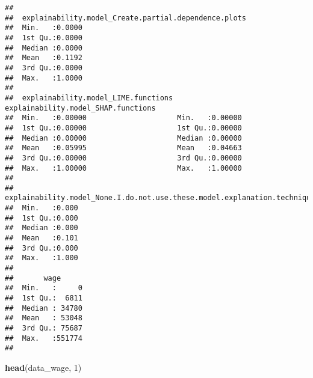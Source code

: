 \documentclass[
]{article}
\newenvironment{Shaded}{\begin{snugshade}}{\end{snugshade}}
\newcommand{\DecValTok}[1]{\textcolor[rgb]{0.00,0.00,0.81}{#1}}
\newcommand{\FunctionTok}[1]{\textcolor[rgb]{0.13,0.29,0.53}{\textbf{#1}}}
\newcommand{\NormalTok}[1]{#1}
\begin{document}
\begin{verbatim}
##                                                  
##  explainability.model_Create.partial.dependence.plots
##  Min.   :0.0000                                      
##  1st Qu.:0.0000                                      
##  Median :0.0000                                      
##  Mean   :0.1192                                      
##  3rd Qu.:0.0000                                      
##  Max.   :1.0000                                      
##                                                      
##  explainability.model_LIME.functions explainability.model_SHAP.functions
##  Min.   :0.00000                     Min.   :0.00000                    
##  1st Qu.:0.00000                     1st Qu.:0.00000                    
##  Median :0.00000                     Median :0.00000                    
##  Mean   :0.05995                     Mean   :0.04663                    
##  3rd Qu.:0.00000                     3rd Qu.:0.00000                    
##  Max.   :1.00000                     Max.   :1.00000                    
##                                                                         
##  explainability.model_None.I.do.not.use.these.model.explanation.techniques
##  Min.   :0.000                                                            
##  1st Qu.:0.000                                                            
##  Median :0.000                                                            
##  Mean   :0.101                                                            
##  3rd Qu.:0.000                                                            
##  Max.   :1.000                                                            
##                                                                           
##       wage       
##  Min.   :     0  
##  1st Qu.:  6811  
##  Median : 34780  
##  Mean   : 53048  
##  3rd Qu.: 75687  
##  Max.   :551774  
## 
\end{verbatim}

\begin{Shaded}
\begin{Highlighting}[]
\FunctionTok{head}\NormalTok{(data\_wage, }\DecValTok{1}\NormalTok{)}
\end{Highlighting}
\end{Shaded}
\end{document}
